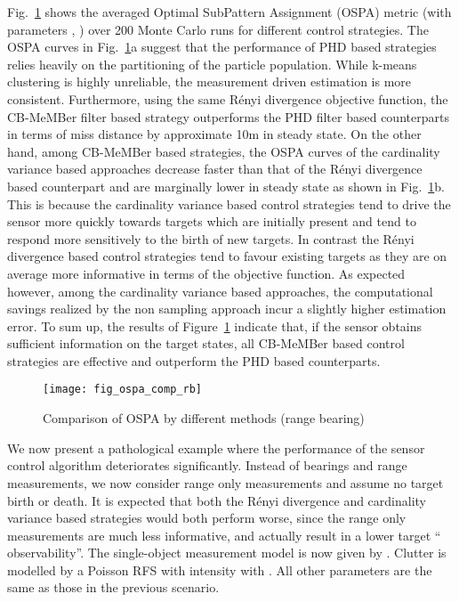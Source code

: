 \documentclass[twocolumn]{autart}
\begin{document}
Fig.~\ref{fig2} shows the averaged Optimal SubPattern Assignment (OSPA) metric \cite{SVV08} (with parameters , ) over 200 Monte Carlo runs for different control strategies. The OSPA curves in Fig.~\ref{fig2}a suggest that the performance of PHD based strategies relies heavily on the partitioning of the particle population. While k-means clustering is highly unreliable, the measurement driven estimation \cite{RVC11} is more consistent. Furthermore, using the same R\'enyi divergence objective function, the CB-MeMBer filter based strategy outperforms the PHD filter based counterparts in terms of miss distance by approximate 10m in steady state. On the other hand, among CB-MeMBer based strategies, the OSPA curves of the cardinality variance based approaches decrease faster than that of the R\'{e}nyi divergence based counterpart and are marginally lower in steady state as shown in Fig.~\ref{fig2}b. This is because the cardinality variance based control strategies tend to drive the sensor more quickly towards targets which are initially present and tend to respond more sensitively to the birth of new targets. In contrast the R\'enyi divergence based control strategies tend to favour existing targets as they are on average more informative in terms of the objective function. As expected however, among the cardinality variance based approaches, the computational savings realized by the non sampling approach incur a slightly higher estimation error. To sum up, the results of Figure~\ref{fig2} indicate that, if the sensor obtains sufficient information on the target states, all CB-MeMBer based control strategies are effective and outperform the PHD based counterparts.
\begin{figure}[htb]
\centering
\texttt{[image: fig\_ospa\_comp\_rb]}
\caption{Comparison of OSPA by different methods (range bearing)}
\label{fig2}
\end{figure}

We now present a pathological example where the performance of the sensor
control algorithm deteriorates significantly. Instead of bearings and range
measurements, we now consider range only measurements and assume no target birth or death. It is expected that
both the R\'{e}nyi divergence and cardinality variance based strategies
would both perform worse, since the range only measurements are much less
informative, and actually result in a lower target \textquotedblleft
observability\textquotedblright . The single-object measurement model is now
given by . Clutter is modelled by a Poisson
RFS with intensity  with . All other
parameters are the same as those in the previous scenario.
\end{document}
